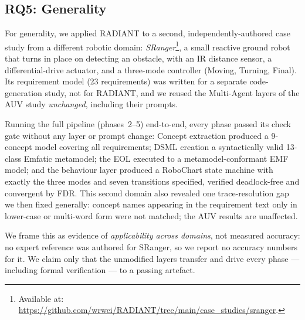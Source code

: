 \subsection{RQ5: Generality}

For generality, we applied RADIANT to a second, independently-authored case study from a different robotic domain: \emph{SRanger}\footnote{Available at: \url{https://github.com/wrwei/RADIANT/tree/main/case_studies/sranger}.}, a small reactive ground robot that turns in place on detecting an obstacle, with an IR distance sensor, a differential-drive actuator, and a three-mode controller (Moving, Turning, Final).
Its requirement model (23 requirements) was written for a separate code-generation study, not for RADIANT, and we reused the Multi-Agent layers of the AUV study \emph{unchanged}, including their prompts.

Running the full pipeline (phases~2--5) end-to-end, every phase passed its check gate without any layer or prompt change: Concept extraction produced a 9-concept model covering all requirements; DSML creation a syntactically valid 13-class Emfatic metamodel; the EOL executed to a metamodel-conformant EMF model; and the behaviour layer produced a RoboChart state machine with exactly the three modes and seven transitions specified, verified deadlock-free and convergent by FDR.
This second domain also revealed one trace-resolution gap we then fixed generally: concept names appearing in the requirement text only in lower-case or multi-word form were not matched; the AUV results are unaffected.

We frame this as evidence of \textit{applicability across domains}, not measured accuracy: no expert reference was authored for SRanger, so we report no accuracy numbers for it.
We claim only that the unmodified layers transfer and drive every phase --- including formal verification --- to a passing artefact.
